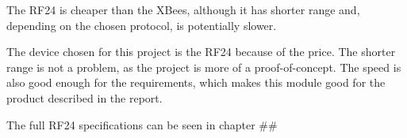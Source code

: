 The RF24 is cheaper than the XBees, although it has shorter range and, depending on the chosen protocol, is potentially slower.


The device chosen for this project is the RF24 because of the price. The shorter range is not a problem, as the project is more of a proof-of-concept. The speed is also good enough for the requirements, which makes this module good for the product described in the report.

The full RF24 specifications can be seen in chapter \#\#

